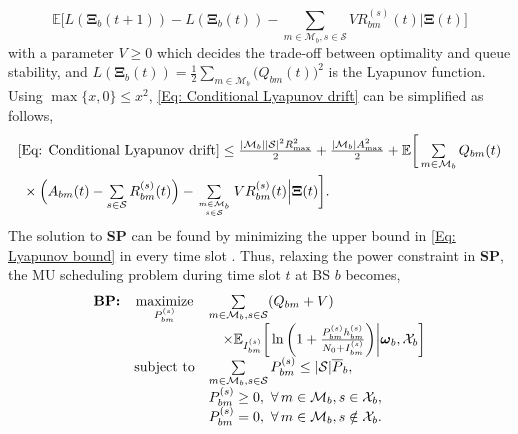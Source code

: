 \documentclass[conference]{IEEEtran}
\newcommand{\totalpower}[1]{%
	\overline{P}_{#1}%
}
\begin{document}
%
%
\begin{equation}\label{Eq: Conditional Lyapunov drift}
\textstyle\mathbb{E}\Big[L(\mathbf{\Xi}_b(t+1))-L(\mathbf{\Xi}_b(t))-\sum\limits_{m\in\mathcal{M}_b,  s\in\mathcal{S}}VR_{bm}^{(s)}(t)
\Big|\mathbf{\Xi}(t)\Big]
\end{equation}
%
%
%
with a parameter $V\geq 0$ which decides the trade-off between optimality and queue stability, and $L(\mathbf{\Xi}_b(t))=\frac{1}{2}\sum_{m\in\mathcal{M}_b}\big(Q_{bm}(t)\big)^2$ is the Lyapunov function.
%
%
%
%
Using $\max\{x,0\}\leq x^2$,  \eqref{Eq: Conditional Lyapunov drift} can be simplified as follows,
%
%
\begin{align}
&\eqref{Eq: Conditional Lyapunov drift}
%
%
%
%
\leq\textstyle \frac{|\mathcal{M}_b||\mathcal{S}|^2R^2_{{\rm max}}}{2}+\frac{|\mathcal{M}_b|A_{{\rm max}}^2}{2}+\mathbb{E}\bigg[\sum\limits_{m\in\mathcal{M}_b}Q_{bm}(t) \notag
%
\\&~\textstyle\times \Big(A_{bm}(t)-\sum\limits_{s\in\mathcal{S}}R_{bm}^{(s)}(t)\Big)-\sum\limits_{m\in\mathcal{M}_b\atop s\in\mathcal{S}}VR_{bm}^{(s)}(t)
\Big|\mathbf{\Xi}(t)\bigg].\label{Eq: Lyapunov bound}
\end{align}
%
%
%
%
The solution to {\bf SP} can be found by minimizing the upper bound in \eqref{Eq: Lyapunov bound} in every time slot \cite{Neely/Stochastic}. Thus, relaxing the power constraint in {\bf SP}, the MU scheduling problem during time slot $t$ at BS $b$ becomes,
%
%
%
$$\begin{array}{ccl}
{\mbox{\bf BP:}}&\underset{P_{bm}^{(s)}}{\text{maximize}} & \sum\limits_{m\in\mathcal{M}_b,s\in\mathcal{S}}(Q_{bm}+V)
%
\\ && \quad \times\mathbb{E}_{I_{bm}^{(s)}}  \bigg[\ln\bigg(1+\frac{P_{bm}^{(s)}h_{bm}^{(s)}}{N_0+ I_{bm}^{(s)}} \bigg)\bigg|\boldsymbol{\omega}_b,\mathcal{X}_b\bigg]
%
\\& \mbox{subject to}& \sum\limits_{m\in\mathcal{M}_b,s\in\mathcal{S}}P_{bm}^{(s)} \leq |\mathcal{S}|\totalpower{b},
%
\\&&P_{bm}^{(s)}  \geq 0, ~ \forall\,m\in\mathcal{M}_b,s\in\mathcal{X}_b,%
\\&&P_{bm}^{(s)}  = 0, ~ \forall\,m\in\mathcal{M}_b,s\notin\mathcal{X}_b.
\end{array}$$
\end{document}
